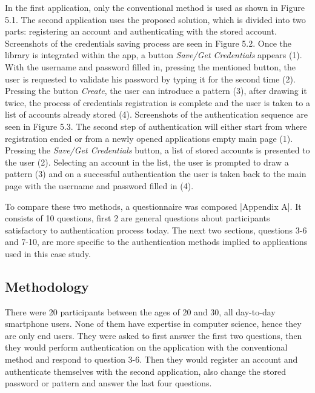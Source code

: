 In the first application, only the conventional method is used as shown in Figure 5.1. The second application uses the proposed solution, which is divided into two parts: registering an account and authenticating with the stored account. Screenshots of the credentials saving process are seen in Figure 5.2. Once the library is integrated within the app, a button \textit{Save/Get Credentials} appears (1). With the username and password filled in, pressing the mentioned button, the user is requested to validate his password by typing it for the second time (2). Pressing the button \textit{Create}, the user can introduce a pattern (3), after drawing it twice, the process of credentials registration is complete and the user is taken to a list of accounts already stored (4). Screenshots of the authentication sequence are seen in Figure 5.3. The second step of authentication will either start from where registration ended or from a newly opened applications empty main page (1). Pressing the \textit{Save/Get Credentials} button, a list of stored accounts is presented to the user (2). Selecting an account in the list, the user is prompted to draw a pattern (3) and on a successful authentication the user is taken back to the main page with the username and password filled in (4).

To compare these two methods, a questionnaire was composed |Appendix A|. It consists of 10 questions, first 2 are general questions about participants satisfactory to authentication process today. The next two sections, questions 3-6 and 7-10, are more specific to the authentication methods implied to applications used in this case study. 

\subsection{Methodology}
There were 20 participants between the ages of 20 and 30, all day-to-day smartphone users. None of them have expertise in computer science, hence they are only end users. They were asked to first answer the first two questions, then they would perform authentication on the application with the conventional method and respond to question 3-6. Then they would register an account and authenticate themselves with the second application, also change the stored password or pattern and answer the last four questions. 

